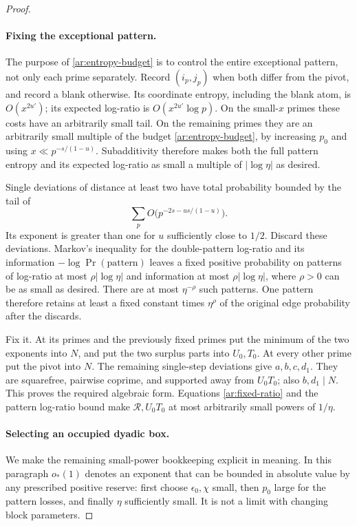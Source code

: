 \begin{proof}
\paragraph{Fixing the exceptional pattern.}
The purpose of \eqref{ar:entropy-budget} is to control the entire
exceptional pattern, not only each prime separately. Record $(i_p,j_p)$
when both differ from the pivot, and record a blank otherwise. Its
coordinate entropy, including the blank atom, is $O(x^{2u'})$; its
expected log-ratio is $O(x^{2u'}\log p)$. On the small-$x$ primes these
costs have an arbitrarily small tail. On the remaining primes they are
an arbitrarily small multiple of the budget
\eqref{ar:entropy-budget}, by increasing $p_0$ and using
$x\ll p^{-s/(1-u)}$. Subadditivity therefore makes both the full pattern
entropy and its expected log-ratio as small a multiple of
$|\log\eta|$ as desired.

Single deviations of distance at least two have total probability
bounded by the tail of
\[
 \sum_p O\bigl(p^{-2s-us/(1-u)}\bigr).
\]
Its exponent is greater than one for $u$ sufficiently close to $1/2$.
Discard these deviations. Markov's inequality for the double-pattern
log-ratio and its information $-\log\Pr(\text{pattern})$ leaves a
fixed positive probability on patterns of log-ratio at most
$\rho|\log\eta|$ and information at most $\rho|\log\eta|$, where
$\rho>0$ can be as small as desired. There are at most $\eta^{-\rho}$
such patterns. One pattern therefore retains at least a fixed constant
times $\eta^\rho$ of the original edge probability after the discards.

Fix it. At its primes and the previously fixed primes put the minimum
of the two exponents into $N$, and put the two surplus parts into
$U_0,T_0$. At every other prime put the pivot into $N$. The remaining
single-step deviations give $a,b,c,d_1$. They are squarefree, pairwise
coprime, and supported away from $U_0T_0$; also $b,d_1\mid N$.
This proves the required algebraic form. Equations
\eqref{ar:fixed-ratio} and the pattern log-ratio bound make
$\mathcal R,U_0T_0$ at most arbitrarily small powers of $1/\eta$.

\paragraph{Selecting an occupied dyadic box.}
We make the remaining small-power bookkeeping explicit in meaning.
In this paragraph $o_*(1)$ denotes an exponent that can be bounded in
absolute value by any prescribed positive reserve: first choose
$\epsilon_0,\chi$ small, then $p_0$ large for the pattern losses, and
finally $\eta$ sufficiently small. It is not a limit with changing
block parameters.


\end{proof}

